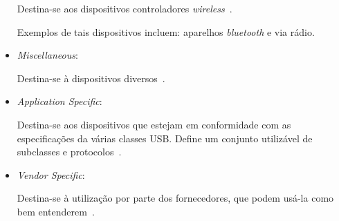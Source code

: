 \begin{itemize}
	Destina-se aos dispositivos controladores \emph{wireless}~\cite{usbclasscodes}.

	Exemplos de tais dispositivos incluem: aparelhos \emph{bluetooth} e via rádio.
	\item \emph{Miscellaneous}:

	Destina-se à dispositivos diversos~\cite{usbclasscodes}.
	\item \emph{Application Specific}:

	Destina-se aos dispositivos que estejam em conformidade com as especificações da várias classes USB. Define um conjunto utilizável de subclasses e protocolos~\cite{usbclasscodes}.
	\item \emph{Vendor Specific}:

	Destina-se à utilização por parte dos fornecedores, que podem usá-la como bem entenderem~\cite{usbclasscodes}.
\end{itemize}

